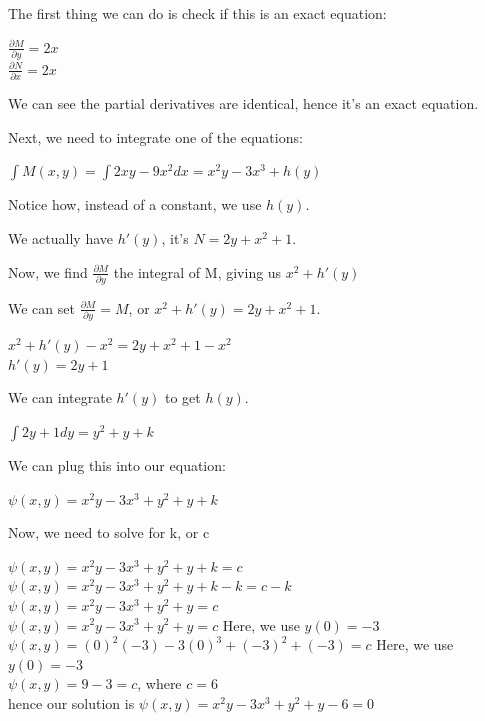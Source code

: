 \documentclass{article}
\begin{document}
The first thing we can do is check if this is an exact equation:

\begin{center}
    $\frac{\partial M}{\partial y} = 2x$ \\
    $\frac{\partial N}{\partial x} = 2x$
\end{center}

We can see the partial derivatives are identical, hence it's an exact equation.

Next, we need to integrate one of the equations:

\begin{center}
    $\int M(x,y) = \int 2xy - 9x^2 dx = x^2 y - 3x^3 + h(y) $
\end{center}

Notice how, instead of a constant, we use $h(y)$.

We actually have $h'(y)$, it's $N = 2y + x^2 + 1$.

Now, we find $\frac{\partial M}{\partial y}$ the integral of M, giving us $x^2 + h'(y)$

We can set $\frac{\partial M}{\partial y} = M$, or $x^2 + h'(y) = 2y + x^2 + 1$.

\begin{center}
    $x^2 + h'(y) - x^2 = 2y + x^2 + 1 - x^2$ \\
    $h'(y) = 2y + 1$
\end{center}

We can integrate $h'(y)$ to get $h(y)$.

\begin{center}
    $\int 2y + 1 dy = y^2 + y + k$
\end{center}

We can plug this into our equation:

\begin{center}
    $\psi (x,y) = x^2 y - 3x^3 + y^2 + y + k$
\end{center}

Now, we need to solve for k, or c

\begin{center}
    $\psi (x,y) = x^2 y - 3x^3 + y^2 + y + k = c$ \\
    $\psi (x,y) = x^2 y - 3x^3 + y^2 + y + k - k = c - k$ \\
    $\psi (x,y) = x^2 y - 3x^3 + y^2 + y = c$ \\
    $\psi (x,y) = x^2 y - 3x^3 + y^2 + y = c$ Here, we use $y(0) = -3$ \\
    $\psi (x,y) = (0)^2 (-3) - 3(0)^3 + (-3)^2 + (-3) = c$ Here, we use $y(0) = -3$ \\
    $\psi (x,y) = 9 -3 = c$, where $c = 6$ \\
    hence our solution is $\psi (x,y) = x^2 y - 3x^3 + y^2 + y - 6 = 0$ \\
\end{center}
\end{document}

